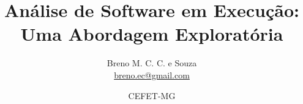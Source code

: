 
\title{\vspace{-15mm}\fontsize{24pt}{10pt}\selectfont\textbf{
  Análise de Software em Execução: Uma Abordagem Exploratória
}} %

\author{
    Breno M. C. C. e Souza\\
    \href{mailto:breno.ec@gmail.com}{breno.ec@gmail.com}\\
}

\date{CEFET-MG} %
